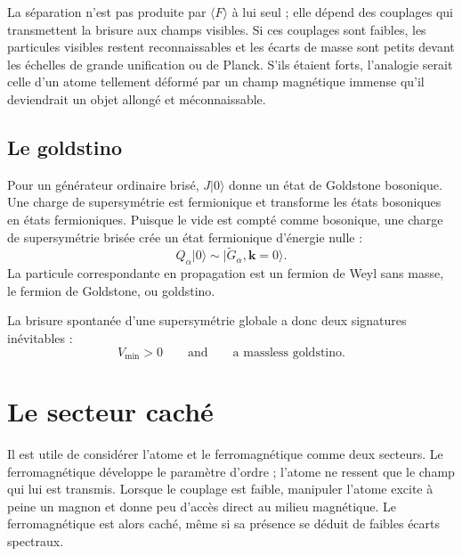 La séparation n’est pas produite par \(\langle F\rangle\) à lui seul ; elle dépend des couplages qui transmettent la brisure aux champs visibles. Si ces couplages sont faibles, les particules visibles restent reconnaissables et les écarts de masse sont petits devant les échelles de grande unification ou de Planck. S’ils étaient forts, l’analogie serait celle d’un atome tellement déformé par un champ magnétique immense qu’il deviendrait un objet allongé et méconnaissable.

\subsection{Le goldstino}

Pour un générateur ordinaire brisé, \(J|0\rangle\) donne un état de Goldstone bosonique. Une charge de supersymétrie est fermionique et transforme les états bosoniques en états fermioniques. Puisque le vide est compté comme bosonique, une charge de supersymétrie brisée crée un état fermionique d’énergie nulle :
\begin{equation}
Q_\alpha|0\rangle
\sim
|\widetilde G_\alpha,\mathbf k=0\rangle.
\label{eq:l9-goldstino}
\end{equation}
La particule correspondante en propagation est un fermion de Weyl sans masse, le fermion de Goldstone, ou goldstino.

\begin{classroomqa}\end{classroomqa}

La brisure spontanée d’une supersymétrie globale a donc deux signatures inévitables :
\begin{equation}
\boxed{
V_{\min}>0
\qquad\text{and}\qquad
\text{a massless goldstino}.
}
\label{eq:l9-rigid-breaking-signatures}
\end{equation}

\section{Le secteur caché}

Il est utile de considérer l’atome et le ferromagnétique comme deux secteurs. Le ferromagnétique développe le paramètre d’ordre ; l’atome ne ressent que le champ qui lui est transmis. Lorsque le couplage est faible, manipuler l’atome excite à peine un magnon et donne peu d’accès direct au milieu magnétique. Le ferromagnétique est alors caché, même si sa présence se déduit de faibles écarts spectraux.

